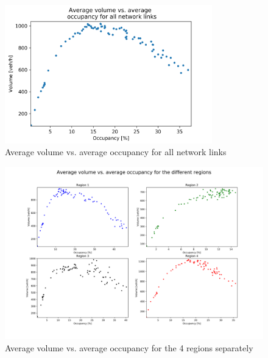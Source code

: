 \documentclass[a4paper, 12pt,oneside]{article}
\begin{document}
\begin{figure}[H]
    \begin{center}
        \includegraphics[width=9cm]{Images/Average volume vs. average occupancy for all network links.png}
        \caption{Average volume vs. average occupancy for all network links}
        \label{Average volume vs. average occupancy for all network links}
    \end{center}
\end{figure}

\begin{figure}[H]
    \begin{center}
        \includegraphics[width=18cm]{Images/Average volume vs. average occupancy for the 4 regions separatly.png}
        \caption{Average volume vs. average occupancy for the 4 regions separately}
        \label{Average volume vs. average occupancy for the 4 regions separately}
    \end{center}
\end{figure}
\end{document}
